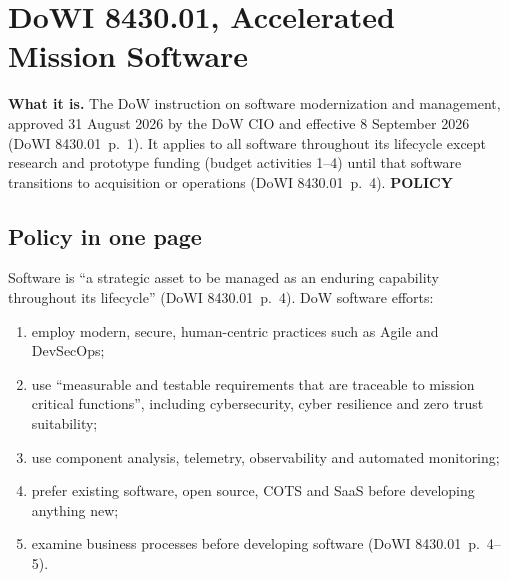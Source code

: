 \documentclass[11pt,letterpaper,twoside,openany]{memoir}
\newcommand{\pg}[2]{{\small(#1~p.~#2)}}          %
\newcommand{\st}[1]{{\sffamily\scriptsize\bfseries #1}}   %
\begin{document}
\section{DoWI 8430.01, Accelerated Mission Software}\label{sec:dowi}
\textbf{What it is.} The DoW instruction on software modernization and management, approved 31 August 2026 by the DoW
CIO and effective 8 September 2026 \pg{DoWI 8430.01}{1}. It applies to all software throughout its lifecycle except
research and prototype funding (budget activities 1--4) until that software transitions to acquisition or operations
\pg{DoWI 8430.01}{4}. \st{POLICY}

\subsection{Policy in one page}
Software is ``a strategic asset to be managed as an enduring capability throughout its lifecycle''
\pg{DoWI 8430.01}{4}. DoW software efforts:
\begin{enumerate}[(1)]
\item employ modern, secure, human-centric practices such as Agile and DevSecOps;
\item use ``measurable and testable requirements that are traceable to mission critical functions'', including
  cybersecurity, cyber resilience and zero trust suitability;
\item use component analysis, telemetry, observability and automated monitoring;
\item prefer existing software, open source, COTS and SaaS before developing anything new;
\item examine business processes before developing software \pg{DoWI 8430.01}{4--5}.
\end{enumerate}
\end{document}
